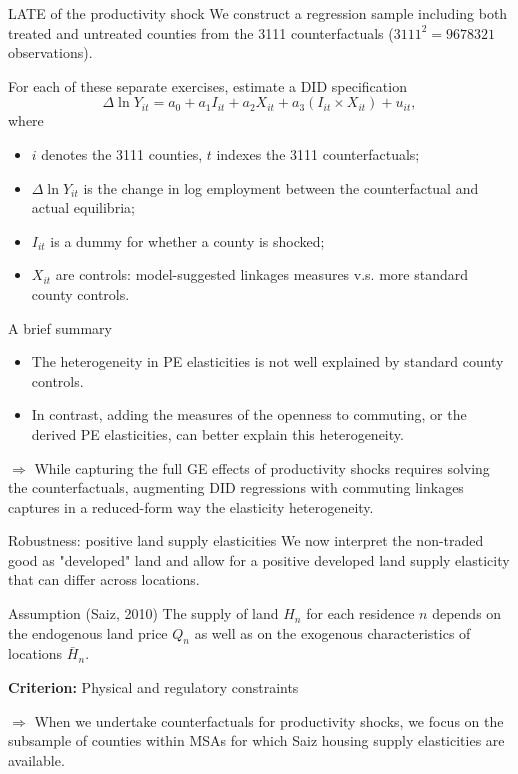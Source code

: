 \documentclass{beamer}
\begin{document}
\begin{frame}{LATE of the productivity shock}
	We construct a regression sample including both treated and untreated counties from the 3111 counterfactuals ($3111^2=9678321$ observations).
	\medskip

	For each of these separate exercises, estimate a DID specification
	\begin{equation}
		\Delta \ln Y_{it} = a_0 + a_1I_{it} + a_2X_{it} + a_3\left(I_{it}\times X_{it}\right) + u_{it},
	\end{equation}
	where
	\begin{itemize}
		\item $i$ denotes the 3111 counties, $t$ indexes the 3111 counterfactuals;
		\item $\Delta \ln Y_{it}$ is the change in log employment between the counterfactual and actual equilibria;
		\item $I_{it}$ is a dummy for whether a county is shocked;
		\item $X_{it}$ are controls: model-suggested linkages measures v.s. more standard county controls.
	\end{itemize}
\end{frame}
\begin{frame}{A brief summary}
	\begin{itemize}
		\item The heterogeneity in PE elasticities is not well explained by standard county controls.
		\item In contrast, adding the measures of the openness to commuting, or the derived PE elasticities, can better explain this heterogeneity.
	\end{itemize}
	\medskip

	$\Rightarrow$ While capturing the full GE effects of productivity shocks requires solving the counterfactuals, augmenting DID regressions with commuting linkages captures in a reduced-form way the elasticity heterogeneity.
\end{frame}
\begin{frame}{Robustness: positive land supply elasticities}
	We now interpret the non-traded good as "developed" land and allow for a positive developed land supply elasticity that can differ across locations.
	\medskip
	\begin{block}{Assumption (Saiz, 2010)}
		The supply of land $H_n$ for each residence $n$ depends on the endogenous land price $Q_n$ as well as on the exogenous characteristics of locations $\bar{H}_n$.
		\medskip
		
		\textbf{Criterion:} Physical and regulatory constraints
	\end{block}
	\medskip
	$\Rightarrow$ When we undertake counterfactuals for productivity shocks, we focus on the subsample of counties within MSAs for which Saiz housing supply elasticities are available.
\end{frame}
\end{document}
